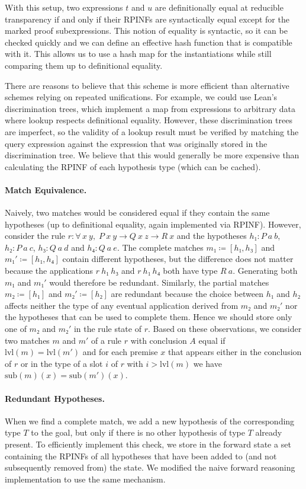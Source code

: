 \documentclass[runningheads,leqno]{llncs}
\newcommand{\para}[1]{\paragraph{\bfseries\upshape #1}}
\newcommand{\All}[2]{\ensuremath{\forall\, #1,\; #2}}
\newcommand{\sub}{\ensuremath{\mathrm{sub}}}
\newcommand{\lvl}{\ensuremath{\mathrm{lvl}}}
\begin{document}
With this setup, two expressions $t$ and $u$ are definitionally equal at reducible transparency if and only if their RPINFs are syntactically equal except for the marked proof subexpressions.
This notion of equality is syntactic, so it can be checked quickly and we can define an effective hash function that is compatible with it.
This allows us to use a hash map for the instantiations while still comparing them up to definitional equality.

There are reasons to believe that this scheme is more efficient than alternative schemes relying on repeated unifications.
For example, we could use Lean's discrimination trees, which implement a map from expressions to arbitrary data where lookup respects definitional equality.
However, these discrimination trees are imperfect, so the validity of a lookup result must be verified by matching the query expression against the expression that was originally stored in the discrimination tree.
We believe that this would generally be more expensive than calculating the RPINF of each hypothesis type (which can be cached).

\para{Match Equivalence.}
Naively, two matches would be considered equal if they contain the same hypotheses (up to definitional equality, again implemented via RPINF).
However, consider the rule $r : \All{x~y}{P~x~y → Q~x~z → R~x}$ and the hypotheses $h₁ : P~a~b$, $h₂ : P~a~c$, $h₃ : Q~a~d$ and $h₄ : Q~a~e$.
The complete matches $m₁ ≔ [h₁, h₃]$ and $m₁' ≔ [h₁, h₄]$ contain different hypotheses, but the difference does not matter because the applications $r~h₁~h₃$ and $r~h₁~h₄$ both have type $R~a$.
Generating both $m₁$ and $m₁'$ would therefore be redundant.
Similarly, the partial matches $m₂ ≔ [h₁]$ and $m₂' ≔ [h₂]$ are redundant because the choice between $h₁$ and $h₂$ affects neither the type of any eventual application derived from $m₂$ and $m₂'$ nor the hypotheses that can be used to complete them.
Hence we should store only one of $m₂$ and $m₂'$ in the rule state of $r$.
Based on these observations, we consider two matches $m$ and $m'$ of a rule $r$ with conclusion $A$ equal if $\lvl(m) = \lvl(m')$ and for each premise $x$ that appears either in the conclusion of $r$ or in the type of a slot $i$ of $r$ with $i > \lvl(m)$ we have $\sub(m)(x) = \sub(m')(x)$.

\para{Redundant Hypotheses.}
When we find a complete match, we add a new hypothesis of the corresponding type $T$ to the goal, but only if there is no other hypothesis of type $T$ already present.
To efficiently implement this check, we store in the forward state a set containing the RPINFs of all hypotheses that have been added to (and not subsequently removed from) the state.
We modified the naive forward reasoning implementation to use the same mechanism.
\end{document}

